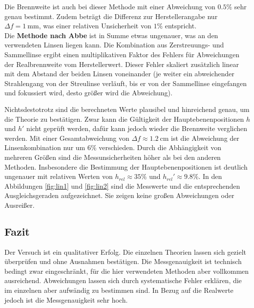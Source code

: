 Die Brennweite ist auch bei dieser Methode mit einer Abweichung von $0.5\%$ sehr genau bestimmt. Zudem beträgt die Differenz zur Herstellerangabe nur $\Delta f = \SI{1}{\milli\meter}$,
was einer relativen Unsicherheit von $1\%$ entspricht. \\

Die \textbf{Methode nach Abbe} ist in Summe etwas ungenauer, was an den verwendeten Linsen liegen kann. Die Kombination aus Zerstreuungs- und Sammellinse ergibt einen multiplikativen Faktor des Fehlers
für Abweichungen der Realbrennweite vom Herstellerwert. Dieser Fehler skaliert zusätzlich linear mit dem Abstand der beiden Linsen voneinander (je weiter ein abweichender
Strahlengang von der Streulinse verläuft, bis er von der Sammellinse eingefangen und fokussiert wird, desto größer wird die Abweichung).

Nichtsdestotrotz sind die berechneten Werte plausibel und hinreichend genau, um die Theorie zu bestätigen. Zwar kann die Gültigkeit der Hauptebenenpositionen $h$ und $h'$ nicht geprüft werden,
dafür kann jedoch wieder die Brennweite verglichen werden. Mit einer Gesamtabweichung von $\Delta f \approx \SI{1.2}{\centi\meter}$ ist die Abweichung der Linsenkombination
nur um $6\%$ verschieden. Durch die Abhängigkeit von mehreren Größen sind die Messunsicherheiten höher als bei den anderen Methoden. Insbesondere die Bestimmung der
Hauptebenenpositionen ist deutlich ungenauer mit relativen Werten von $h_{rel} \approx 35\%$ und $h_{rel}' \approx 9.8\%$. In den Abbildungen \ref{fig:lin1} und \ref{fig:lin2}
sind die Messwerte und die entsprechenden Ausgleichsgeraden aufgezeichnet. Sie zeigen keine großen Abweichungen oder Ausreißer.

\subsection{Fazit}
Der Versuch ist ein qualitativer Erfolg. Die einzelnen Theorien lassen sich gezielt überprüfen und ohne Ausnahmen bestätigen.
Die Messgenauigkeit ist technisch bedingt zwar eingeschränkt, für die hier verwendeten Methoden aber vollkommen ausreichend.
Abweichungen lassen sich durch systematische Fehler erklären, die im einzelnen aber aufwändig zu bestimmen sind. In Bezug auf die Realwerte jedoch ist die Messgenauigkeit sehr hoch.